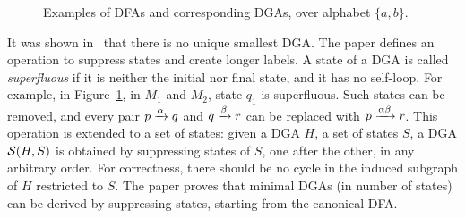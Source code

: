 \begin{figure}
\caption{Examples of DFAs and corresponding DGAs, over alphabet
  $\{a, b\}$.}
\label{fig:dfa-dga-examples}
\end{figure}


It was
shown in~ \cite{giammarresi1999deterministic} that there is no unique smallest DGA. The paper defines an operation
to suppress states and create longer labels. A state of a DGA is
called \emph{superfluous} if it is neither the initial nor final state,
and it has no self-loop. For example, in
Figure~\ref{fig:dfa-dga-examples}, in $M_1$ and $M_2$, state $q_1$ is
superfluous. Such states can be removed, and every pair
$p \xrightarrow{\alpha} q$ and $q \xrightarrow{\beta} r$ can be replaced with
$p \xrightarrow{\alpha \beta} r$.  This operation is extended to a set of
states: given a DGA $H$, a set of states $S$, a DGA $\mathcal{S}(H, S)$ is
obtained by suppressing states of $S$, one after the other, in any
arbitrary order. For correctness, there should be no cycle in the
induced subgraph of $H$ restricted to $S$.
The paper proves that minimal DGAs (in number of
states) can be derived by suppressing states, starting from the
canonical DFA.



